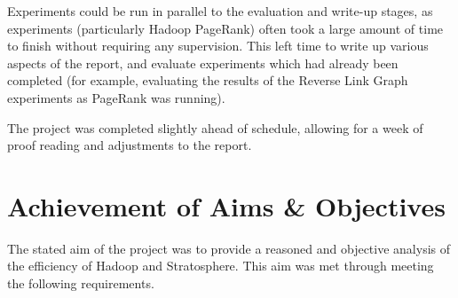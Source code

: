 Experiments could be run in parallel to the evaluation and write-up stages, as experiments (particularly Hadoop PageRank) often took a large amount of time to finish without requiring any supervision. This left time to write up various aspects of the report, and evaluate experiments which had already been completed (for example, evaluating the results of the Reverse Link Graph experiments as PageRank was running).

The project was completed slightly ahead of schedule, allowing for a week of proof reading and adjustments to the report.

\section{Achievement of Aims \& Objectives}
The stated aim of the project was to provide a reasoned and objective analysis of the efficiency of Hadoop and Stratosphere. This aim was met through meeting the following requirements.

